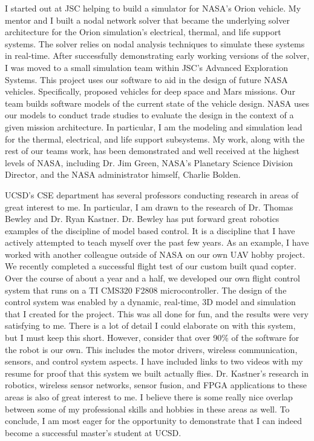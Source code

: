 \documentclass{article}
\begin{document}
I started out at JSC helping to build a simulator for NASA's Orion vehicle. My mentor and I built a nodal network solver that became the underlying solver architecture for the Orion simulation's electrical, thermal, and life support systems.
The solver relies on nodal analysis techniques to simulate these systems in real-time.
After successfully demonstrating early working versions of the solver, I was moved
to a small simulation team within JSC's Advanced Exploration Systems.
This project uses our software to aid in the design of future
NASA vehicles. Specifically, proposed vehicles for deep space and Mars missions. 
Our team builds software models of the current state of the vehicle design. NASA uses our
models to conduct trade studies to evaluate the design in the context of a given mission architecture.
In particular, I am the modeling and simulation lead for the thermal, electrical, and life support
subsystems. My work, along with the rest of our teams work, has been demonstrated and well received 
at the highest levels of NASA, including Dr. Jim Green, NASA's Planetary Science Division Director, and 
the NASA administrator himself, Charlie Bolden.

UCSD's CSE department has several professors conducting research in areas of great interest to me. In particular, I am drawn to the research of Dr. Thomas Bewley and Dr. Ryan Kastner. Dr. Bewley has put forward great robotics examples of the discipline of model based control. It is a discipline that I have actively attempted to teach myself over the past few years. As an example, I have worked with another colleague outside of NASA on our own UAV hobby project. We recently completed a successful flight test of our custom built quad copter. Over the course of about a year and a half, we developed our own flight control system that runs on a TI CMS320 F2808 microcontroller. The design of the control system was enabled by a dynamic, real-time, 3D model and simulation that I created for the project. This was all done for fun, and the results were very satisfying to me. There is a lot of detail I could elaborate on with this system, but I must keep this short. However, consider that over 90\% of the software for the robot is our own. This includes the motor drivers, wireless communication, sensors, and control system aspects. I have included links to two videos with my resume for proof that this system we built actually flies. Dr. Kastner's research in robotics, wireless sensor networks, sensor fusion, and FPGA applications to these areas is also of great interest to me. I believe 
there is some really nice overlap between some of my professional skills and hobbies in these areas as well. To conclude, I am most eager for the opportunity to demonstrate that I can indeed become a successful master's student at UCSD.
\end{document}
